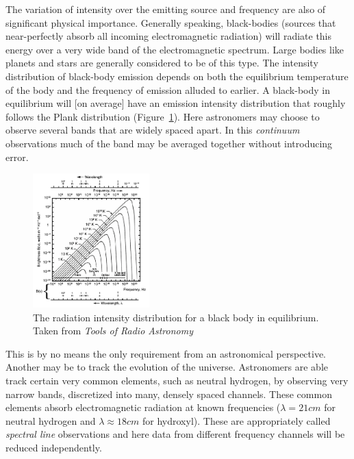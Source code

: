 \documentclass[a4paper,10pt]{report}
\begin{document}
The variation of intensity over the emitting source and frequency are also of significant physical importance. Generally speaking, black-bodies (sources that near-perfectly absorb all incoming electromagnetic radiation)
will radiate this energy over a very wide band of the electromagnetic spectrum. Large bodies like planets and stars are generally considered to be of 
this type. The intensity distribution of black-body emission depends on both the equilibrium temperature of the body and the frequency of emission alluded 
to earlier. A black-body in equilibrium will [on average] have an emission intensity distribution that roughly follows the Plank 
distribution (Figure~\ref{fig_plank}). Here astronomers may choose to observe several bands that are widely spaced apart. In this \textit{continuum} 
observations much of the band may be averaged together without introducing error.

\begin{figure}[ht]
 \begin{mdframed}
 \centering
 \includegraphics[width=0.4\textwidth]{images/plank_dist.png}
 \caption[Plank distribution]{The radiation intensity distribution for a black body in equilibrium. Taken from \textit{Tools of Radio Astronomy} \cite{wilson2009tools}}
  \label{fig_plank}
 \end{mdframed}
\end{figure}

This is by no means the only requirement from an astronomical perspective. Another may be to track the evolution of the universe. Astronomers are able
track certain very common elements, such as neutral hydrogen, by observing very narrow bands, discretized into many, densely spaced 
channels. These common elements absorb electromagnetic radiation at known frequencies ($\lambda = 21 cm$ for neutral hydrogen and
$\lambda \approx 18 cm$ for hydroxyl). These are appropriately called \textit{spectral line} observations and here data from different frequency channels
will be reduced independently.
\end{document}
